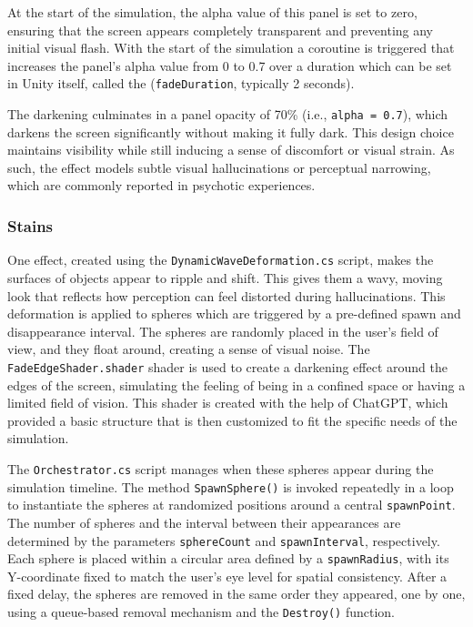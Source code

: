 At the start of the simulation, the alpha value of this panel is set to zero, ensuring that the screen appears completely transparent and preventing any initial visual flash. With the start of the simulation a coroutine is triggered that increases the panel’s alpha value from 0 to 0.7 over a duration which can be set in Unity itself, called the (\texttt{fadeDuration}, typically 2 seconds).

The darkening culminates in a panel opacity of 70\% (i.e., \texttt{alpha = 0.7}), which darkens the screen significantly without making it fully dark. This design choice maintains visibility while still inducing a sense of discomfort or visual strain. As such, the effect models subtle visual hallucinations or perceptual narrowing, which are commonly reported in psychotic experiences. 

\subsubsection{Stains}
One effect, created using the \texttt{DynamicWaveDeformation.cs} script, makes the surfaces of objects appear to ripple and shift. This gives them a wavy, moving look that reflects how perception can feel distorted during hallucinations. This deformation is applied to spheres which are triggered by a pre-defined spawn and disappearance interval. The spheres are randomly placed in the user's field of view, and they float around, creating a sense of visual noise. The \texttt{FadeEdgeShader.shader} shader is used to create a darkening effect around the edges of the screen, simulating the feeling of being in a confined space or having a limited field of vision. This shader is created with the help of ChatGPT, which provided a basic structure that is then customized to fit the specific needs of the simulation.

The \texttt{Orchestrator.cs} script manages when these spheres appear during the simulation timeline. The method \texttt{SpawnSphere()} is invoked repeatedly in a loop to instantiate the spheres at randomized positions around a central \texttt{spawnPoint}. The number of spheres and the interval between their appearances are determined by the parameters \texttt{sphereCount} and \texttt{spawnInterval}, respectively. Each sphere is placed within a circular area defined by a \texttt{spawnRadius}, with its Y-coordinate fixed to match the user’s eye level for spatial consistency. After a fixed delay, the spheres are removed in the same order they appeared, one by one, using a queue-based removal mechanism and the \texttt{Destroy()} function. 

